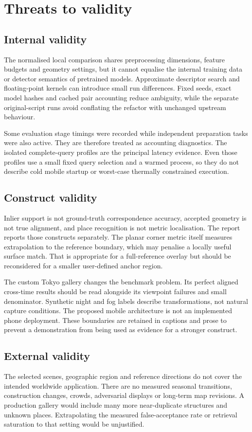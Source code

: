 \section{Threats to validity}
\subsection{Internal validity}
The normalised local comparison shares preprocessing dimensions, feature budgets and geometry settings, but it cannot equalise the internal training data or detector semantics of pretrained models. Approximate descriptor search and floating-point kernels can introduce small run differences. Fixed seeds, exact model hashes and cached pair accounting reduce ambiguity, while the separate original-script runs avoid conflating the refactor with unchanged upstream behaviour.

Some evaluation stage timings were recorded while independent preparation tasks were also active. They are therefore treated as accounting diagnostics. The isolated complete-query profiles are the principal latency evidence. Even those profiles use a small fixed query selection and a warmed process, so they do not describe cold mobile startup or worst-case thermally constrained execution.

\subsection{Construct validity}
Inlier support is not ground-truth correspondence accuracy, accepted geometry is not true alignment, and place recognition is not metric localisation. The report reports those constructs separately. The planar corner metric itself measures extrapolation to the reference boundary, which may penalise a locally useful surface match. That is appropriate for a full-reference overlay but should be reconsidered for a smaller user-defined anchor region.

The custom Tokyo gallery changes the benchmark problem. Its perfect aligned cross-time results should be read alongside its viewpoint failures and small denominator. Synthetic night and fog labels describe transformations, not natural capture conditions. The proposed mobile architecture is not an implemented phone deployment. These boundaries are retained in captions and prose to prevent a demonstration from being used as evidence for a stronger construct.

\subsection{External validity}
The selected scenes, geographic region and reference directions do not cover the intended worldwide application. There are no measured seasonal transitions, construction changes, crowds, adversarial displays or long-term map revisions. A production gallery would include many more near-duplicate structures and unknown places. Extrapolating the measured false-acceptance rate or retrieval saturation to that setting would be unjustified.

